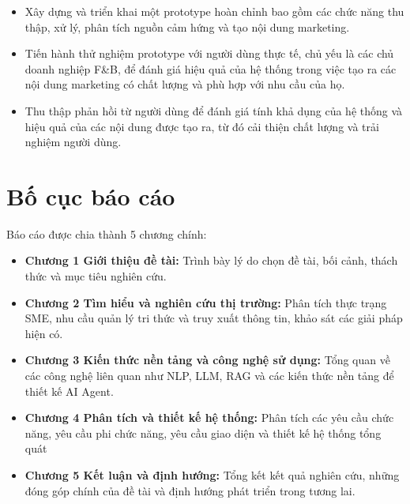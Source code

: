 \begin{itemize}
  \begin{itemize}
  \item
    Xây dựng và triển khai một prototype hoàn chỉnh bao gồm các chức
    năng thu thập, xử lý, phân tích nguồn cảm hứng và tạo nội dung
    marketing.
  \item
    Tiến hành thử nghiệm prototype với người dùng thực tế, chủ yếu là
    các chủ doanh nghiệp F\&B, để đánh giá hiệu quả của hệ thống trong
    việc tạo ra các nội dung marketing có chất lượng và phù hợp với nhu
    cầu của họ.
  \item
    Thu thập phản hồi từ người dùng để đánh giá tính khả dụng của hệ
    thống và hiệu quả của các nội dung được tạo ra, từ đó cải thiện chất
    lượng và trải nghiệm người dùng.
  \end{itemize}
\end{itemize}

\section{Bố cục báo cáo}\label{bux1ed1-cux1ee5c-buxe1o-cuxe1o}

Báo cáo được chia thành 5 chương chính:

\begin{itemize}
\item
  \textbf{Chương 1 Giới thiệu đề tài:} Trình bày lý do chọn đề tài, bối
  cảnh, thách thức và mục tiêu nghiên cứu.
\item
  \textbf{Chương 2 Tìm hiểu và nghiên cứu thị trường:} Phân tích thực
  trạng SME, nhu cầu quản lý tri thức và truy xuất thông tin, khảo sát
  các giải pháp hiện có.
\item
  \textbf{Chương 3 Kiến thức nền tảng và công nghệ sử dụng:} Tổng quan
  về các công nghệ liên quan như NLP, LLM, RAG và các kiến thức nền tảng
  để thiết kế AI Agent.
\item
  \textbf{Chương 4 Phân tích và thiết kế hệ thống:} Phân tích các yêu
  cầu chức năng, yêu cầu phi chức năng, yêu cầu giao diện và thiết kế hệ
  thống tổng quát
\item
  \textbf{Chương 5 Kết luận và định hướng:} Tổng kết kết quả nghiên cứu,
  những đóng góp chính của đề tài và định hướng phát triển trong tương
  lai.
\end{itemize}
